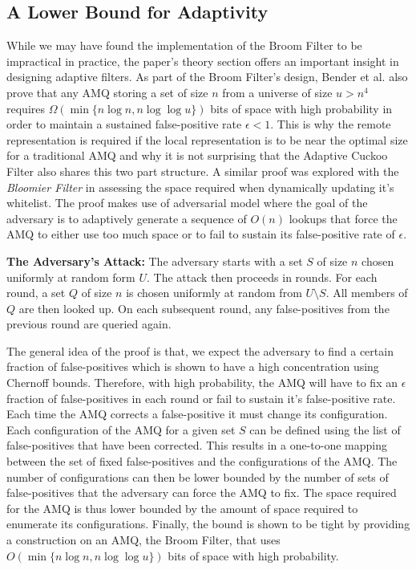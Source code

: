 \documentclass[../paper.tex]{subfiles}
\begin{document}
\subsection{A Lower Bound for Adaptivity} While we may have found the
implementation of the Broom Filter to be impractical in practice, the paper's theory
section offers an important insight in designing adaptive filters. As part of the Broom Filter's design,
Bender et al. also prove that any AMQ storing a set of size $n$ from a universe
of size $u > n^4$ requires $\Omega (\min \{n\log n, n\log\log u\})$ bits of
space with high probability in order to maintain a sustained false-positive
rate $\epsilon < 1$.  This is why the remote representation is required if the
local representation is to be near the optimal size for a traditional AMQ and
why it is not surprising that the Adaptive Cuckoo Filter also shares this two
part structure.  A similar proof was explored with the {\it Bloomier Filter} 
\cite{bloomier-filter} in assessing the space required when dynamically 
updating it's whitelist. The proof makes use of adversarial model where the 
goal of the adversary is to adaptively generate a sequence of $O(n)$ lookups 
that force the AMQ to either use too much space or to fail to sustain its 
false-positive rate of $\epsilon$.  
	
	{\bf The Adversary's Attack:} The adversary starts with a set $S$ of size $n$ chosen
	uniformly at random form $U$.  The attack then proceeds in rounds.  For each round, 
	a set $Q$ of size $n$ is chosen uniformly at random from $U\setminus S$.  All members
	of $Q$ are then looked up. On each subsequent round, any false-positives from the 
	previous round are queried again. 
	
	The general idea of the proof is that, we expect the adversary to find a certain 
	fraction of false-positives which is shown to have a high concentration using Chernoff
	bounds.  Therefore, with high probability, the AMQ will have to fix an $\epsilon$ fraction
	of false-positives in each round or fail to sustain it's false-positive rate.  Each time the 
	AMQ corrects a false-positive it must change its configuration.  Each configuration of the 
	AMQ for a given set $S$ can be defined using the list of false-positives that have been
	corrected.  This results in a one-to-one mapping between the set of fixed false-positives 
	and the configurations of the AMQ.  The number of configurations can then be lower 
	bounded by the number of sets of false-positives that the adversary can force the AMQ
	to fix.  The space required for the AMQ is thus lower bounded by the amount of space 
	required to enumerate its configurations.  Finally, the bound is shown to be tight by 
	providing a construction on an AMQ, the Broom Filter, that uses $O(\min \{n\log n, 
	n\log\log u\})$ bits of space with high probability. 
	
	
\end{document}
